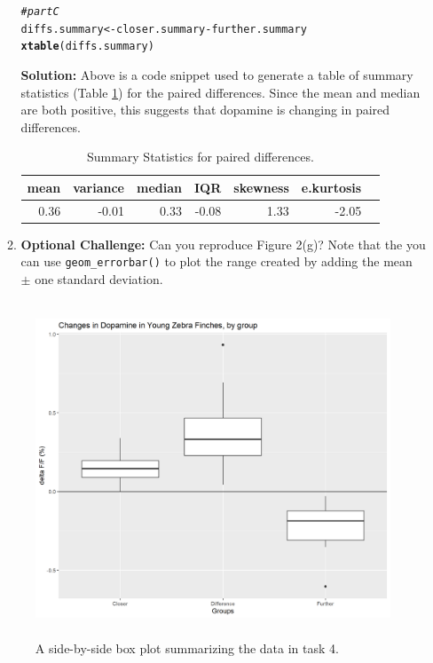 \documentclass{article}\usepackage[]{graphicx}\usepackage[]{xcolor}
\makeatletter
\newcommand{\hlcom}[1]{\textcolor[rgb]{0.678,0.584,0.686}{\textit{#1}}}%
\newcommand{\hlopt}[1]{\textcolor[rgb]{0,0,0}{#1}}%
\newcommand{\hldef}[1]{\textcolor[rgb]{0.345,0.345,0.345}{#1}}%
\newcommand{\hlkwb}[1]{\textcolor[rgb]{0.69,0.353,0.396}{#1}}%
\newcommand{\hlkwd}[1]{\textcolor[rgb]{0.737,0.353,0.396}{\textbf{#1}}}%
\newenvironment{kframe}{%
 \def\at@end@of@kframe{}%
 \ifinner\ifhmode%
  \def\at@end@of@kframe{\end{minipage}}%
  \begin{minipage}{\columnwidth}%
 \fi\fi%
 \def\FrameCommand##1{\hskip\@totalleftmargin \hskip-\fboxsep
 \colorbox{shadecolor}{##1}\hskip-\fboxsep
     \hskip-\linewidth \hskip-\@totalleftmargin \hskip\columnwidth}%
 \MakeFramed {\advance\hsize-\width
   \@totalleftmargin\z@ \linewidth\hsize
   \@setminipage}}%
 {\par\unskip\endMakeFramed%
 \at@end@of@kframe}
\newenvironment{knitrout}{}{} %
\makeatother
\begin{document}
\begin{enumerate}
\begin{enumerate}
\begin{knitrout}
\begin{kframe}
\begin{alltt}
\hlcom{# part C}
\hldef{diffs.summary} \hlkwb{<-} \hldef{closer.summary} \hlopt{-} \hldef{further.summary}
\hlkwd{xtable}\hldef{(diffs.summary)}
\end{alltt}
\end{kframe}
\end{knitrout}
\textbf{Solution:} Above is a code snippet used to generate a table of summary statistics (Table \ref{table4}) for the paired differences. Since the mean and median are both positive, this suggests that dopamine is changing in paired differences.
\begin{table}[ht]
\centering
\begin{tabular}{rrrrrrr}
  \hline
  mean & variance & median & IQR & skewness & e.kurtosis \\ 
  \hline
  0.36 & -0.01 & 0.33 & -0.08 & 1.33 & -2.05 \\ 
   \hline
\end{tabular}
\caption{Summary Statistics for paired differences.}
\label{table4}
\end{table}
  \item \textbf{Optional Challenge:} Can you reproduce Figure 2(g)?
  Note that the you can use \texttt{geom\_errorbar()} to plot
  the range created by adding the mean $\pm$ one standard deviation.
\end{enumerate}
\begin{figure}[H]
\centering
\includegraphics[width=12cm, height=10cm]{sideboxplots.png}
\caption{A side-by-side box plot summarizing the data in task 4.}
\label{plot1}
\end{figure}

\end{enumerate}
\end{document}
